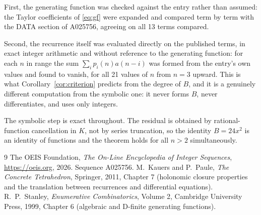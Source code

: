 \documentclass[11pt,a4paper]{article}
\theoremstyle{plain}
\theoremstyle{definition}
\begin{document}
First, the generating function was checked against the entry rather than assumed: the
Taylor coefficients of \eqref{eq:gf} were expanded and compared term by term with the DATA
section of A025756, agreeing on all 13 terms compared.

Second, the recurrence itself was evaluated directly on the published terms, in exact
integer arithmetic and without reference to the generating function: for each $n$ in range
the sum $\sum_{i}p_{i}(n)a(n-i)$ was formed from the entry's own values and found to
vanish, for all 21 values of $n$ from $n=3$ upward. This is what
Corollary~\ref{cor:criterion} predicts from the degree of $B$, and it is a genuinely
different computation from the symbolic one: it never forms $B$, never differentiates, and
uses only integers.

The symbolic step is exact throughout. The residual is obtained by rational-function
cancellation in $K$, not by series truncation, so the identity $B=24 x^{2}$ is an
identity of functions and the theorem holds for all $n>2$ simultaneously.

\begin{thebibliography}{9}
 The OEIS Foundation, \emph{The On-Line Encyclopedia of Integer Sequences},
\url{https://oeis.org}, 2026. Sequence A025756.
 M.~Kauers and P.~Paule, \emph{The Concrete Tetrahedron}, Springer, 2011,
Chapter 7 (holonomic closure properties and the translation between recurrences and
differential equations).
 R.~P.~Stanley, \emph{Enumerative Combinatorics}, Volume 2, Cambridge
University Press, 1999, Chapter 6 (algebraic and D-finite generating functions).
\end{thebibliography}
\end{document}
